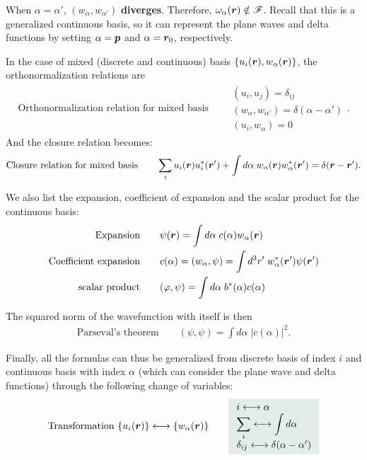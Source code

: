When $\alpha=\alpha'$, $(w_\alpha,w_{\alpha'})$ \textbf{diverges}. Therefore, $\omega_\alpha(\bm{r})\notin\mathscr{F}$. Recall that this is a generalized continuous basis,
so it can represent the plane waves and delta functions by setting $\alpha=\bm{p}$ and $\alpha=\bm{r}_0$, respectively.

In the case of mixed (discrete and continuous) basis $\{u_i(\bm{r}),w_\alpha(\bm{r})\}$, the orthonormalization relations are
\begin{align}
    \text{Orthonormalization relation for mixed basis}\qquad
    \begin{array}{l}
        (u_i,u_j)=\delta_{ij}\\
        (w_\alpha,w_{\alpha'})=\delta(\alpha-\alpha')\\
        (u_i,w_\alpha)=0
    \end{array}.
\end{align}
And the closure relation becomes:
\begin{align}
    \text{Closure relation for mixed basis}\qquad\sum_iu_i(\bm{r})u_i^*(\bm{r}')+\int d\alpha\;w_\alpha(\bm{r})w^*_\alpha(\bm{r}')=\delta(\bm{r}-\bm{r}').
\end{align}

We also list the expansion, coefficient of expansion and the scalar product for the continuous basis:
\begin{align}
    \text{Expansion}&\qquad\psi(\bm{r})=\int d\alpha\;c(\alpha)w_\alpha(\bm{r})\\
    \text{Coefficient expansion}&\qquad c(\alpha)=(w_\alpha,\psi)=\int d^3r'\;w^*_\alpha(\bm{r}')\psi(\bm{r}')\\
    \text{scalar product}&\qquad(\varphi,\psi)=\int d\alpha\;b^*(\alpha)c(\alpha)
\end{align}

The squared norm of the wavefunction with itself is then
\begin{align}
    \text{Parseval's theorem}\qquad(\psi,\psi)=\int d\alpha\;|c(\alpha)|^2.
\end{align}

Finally, all the formulas can thus be generalized from discrete basis of index $i$ and continuous basis with index $\alpha$ (which can consider 
the plane wave and delta functions) through the following change of variables:
\begin{align}
    \text{Transformation $\{u_i(\bR)\}\longleftrightarrow\{w_{\alpha}(\bR)\}$}\qquad
    \highlight{\begin{array}{l}
        i\longleftrightarrow\alpha\\
        \displaystyle\sum_i\longleftrightarrow\int d\alpha\\
        \delta_{ij}\longleftrightarrow\delta(\alpha-\alpha')
    \end{array}}
\end{align}



